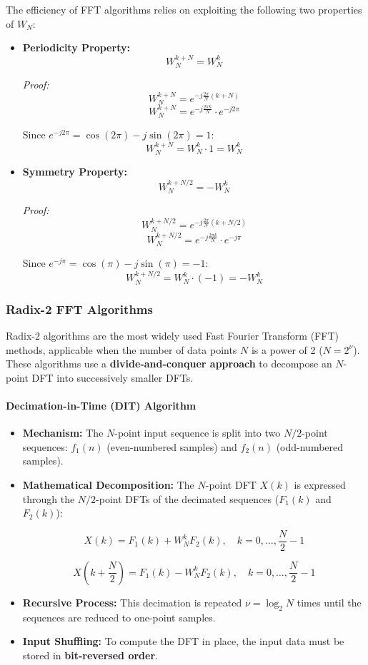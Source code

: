 The efficiency of FFT algorithms relies on exploiting the following two
properties of \(W_N\):

\begin{itemize}
\item
  \textbf{Periodicity Property:} \[W_N^{k+N} = W_N^k\]

  \emph{Proof:} \[W_N^{k+N} = e^{-j\frac{2\pi}{N}(k+N)}\]
  \[W_N^{k+N} = e^{-j\frac{2\pi k}{N}} \cdot e^{-j2\pi}\]

  Since \(e^{-j2\pi} = \cos(2\pi) - j\sin(2\pi) = 1\):
  \[W_N^{k+N} = W_N^k \cdot 1 = W_N^k\]
\item
  \textbf{Symmetry Property:} \[W_N^{k+N/2} = -W_N^k\]

  \emph{Proof:} \[W_N^{k+N/2} = e^{-j\frac{2\pi}{N}(k+N/2)}\]
  \[W_N^{k+N/2} = e^{-j\frac{2\pi k}{N}} \cdot e^{-j\pi}\]

  Since \(e^{-j\pi} = \cos(\pi) - j\sin(\pi) = -1\):
  \[W_N^{k+N/2} = W_N^k \cdot (-1) = -W_N^k\]
\end{itemize}

\hypertarget{radix-2-fft-algorithms}{%
\subsubsection{Radix-2 FFT Algorithms}\label{radix-2-fft-algorithms}}

Radix-2 algorithms are the most widely used Fast Fourier Transform (FFT)
methods, applicable when the number of data points \(N\) is a power of 2
(\(N = 2^{\nu}\)). These algorithms use a \textbf{divide-and-conquer
approach} to decompose an \(N\)-point DFT into successively smaller
DFTs.

\hypertarget{decimation-in-time-dit-algorithm}{%
\paragraph{Decimation-in-Time (DIT)
Algorithm}\label{decimation-in-time-dit-algorithm}}

\begin{itemize}
\item
  \textbf{Mechanism:} The \(N\)-point input sequence is split into two
  \(N/2\)-point sequences: \(f_1(n)\) (even-numbered samples) and
  \(f_2(n)\) (odd-numbered samples).
\item
  \textbf{Mathematical Decomposition:} The \(N\)-point DFT \(X(k)\) is
  expressed through the \(N/2\)-point DFTs of the decimated sequences
  (\(F_1(k)\) and \(F_2(k)\)):

  \[X(k) = F_1(k) + W_N^k F_2(k), \quad k = 0, \dots, \frac{N}{2}-1\]

  \[X(k + \frac{N}{2}) = F_1(k) - W_N^k F_2(k), \quad k = 0, \dots, \frac{N}{2}-1\]
\item
  \textbf{Recursive Process:} This decimation is repeated
  \(\nu = \log_2 N\) times until the sequences are reduced to one-point
  samples.
\item
  \textbf{Input Shuffling:} To compute the DFT in place, the input data
  must be stored in \textbf{bit-reversed order}.
\end{itemize}

